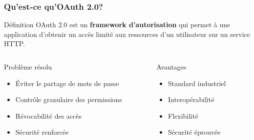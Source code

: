 \documentclass[aspectratio=169]{beamer}
\begin{document}
\begin{frame}
    \frametitle{\faShieldAlt \quad Qu'est-ce qu'OAuth 2.0?}
    \begin{alertblock}{Définition}
        \Large OAuth 2.0 est un \textbf{framework d'autorisation} qui permet à une application d'obtenir un accès limité aux ressources d'un utilisateur sur un service HTTP.
    \end{alertblock}
    
    \vspace{0.5cm}
    \begin{columns}
        \begin{column}{0.5\textwidth}
            \begin{block}{\faExclamationTriangle \quad Problème résolu}
                \begin{itemize}
                    \item \textcolor{errorred}{Éviter le partage de mots de passe}
                    \item \textcolor{primaryblue}{Contrôle granulaire des permissions}
                    \item \textcolor{warningorange}{Révocabilité des accès}
                    \item \textcolor{accentgreen}{Sécurité renforcée}
                \end{itemize}
            \end{block}
        \end{column}
        \begin{column}{0.5\textwidth}
            \begin{block}{\faCheckCircle \quad Avantages}
                \begin{itemize}
                    \item \textcolor{accentgreen}{Standard industriel}
                    \item \textcolor{primaryblue}{Interopérabilité}
                    \item \textcolor{warningorange}{Flexibilité}
                    \item \textcolor{accentgreen}{Sécurité éprouvée}
                \end{itemize}
            \end{block}
        \end{column}
    \end{columns}
\end{frame}
\end{document}
